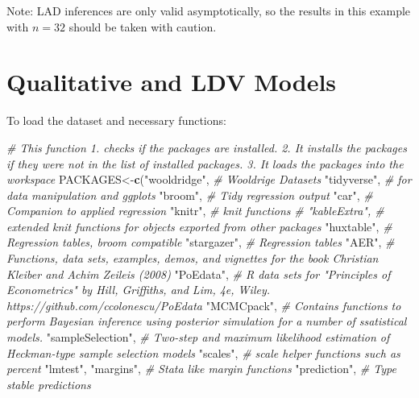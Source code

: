\documentclass[]{book}
\newenvironment{Shaded}{\begin{snugshade}}{\end{snugshade}}
\newcommand{\CommentTok}[1]{\textcolor[rgb]{0.56,0.35,0.01}{\textit{#1}}}
\newcommand{\KeywordTok}[1]{\textcolor[rgb]{0.13,0.29,0.53}{\textbf{#1}}}
\newcommand{\NormalTok}[1]{#1}
\newcommand{\StringTok}[1]{\textcolor[rgb]{0.31,0.60,0.02}{#1}}
\begin{document}
Note: LAD inferences are only valid asymptotically, so the results in
this example with \(n =32\) should be taken with caution.

\hypertarget{binarymodels}{%
\chapter{Qualitative and LDV Models}\label{binarymodels}}

To load the dataset and necessary functions:

\begin{Shaded}
\begin{Highlighting}[]
\CommentTok{# This function 1. checks if the packages are installed. 2. It installs the packages if they were not in the list of installed packages. 3. It loads the packages into the workspace}
\NormalTok{PACKAGES<-}\KeywordTok{c}\NormalTok{(}\StringTok{"wooldridge"}\NormalTok{,  }\CommentTok{# Wooldrige Datasets}
            \StringTok{"tidyverse"}\NormalTok{,  }\CommentTok{# for data manipulation and ggplots}
            \StringTok{"broom"}\NormalTok{,  }\CommentTok{# Tidy regression output}
            \StringTok{"car"}\NormalTok{, }\CommentTok{# Companion to applied regression}
            \StringTok{"knitr"}\NormalTok{, }\CommentTok{# knit functions}
            \CommentTok{# "kableExtra", # extended knit functions for objects exported from other packages}
            \StringTok{"huxtable"}\NormalTok{, }\CommentTok{#  Regression tables, broom compatible}
            \StringTok{"stargazer"}\NormalTok{, }\CommentTok{# Regression tables}
            \StringTok{"AER"}\NormalTok{, }\CommentTok{#  Functions, data sets, examples, demos, and vignettes for the book Christian Kleiber and Achim Zeileis (2008)}
            \StringTok{"PoEdata"}\NormalTok{, }\CommentTok{# R data sets for "Principles of Econometrics" by Hill, Griffiths, and Lim, 4e, Wiley. https://github.com/ccolonescu/PoEdata}
            \StringTok{"MCMCpack"}\NormalTok{, }\CommentTok{# Contains functions to perform Bayesian inference using posterior simulation for a number of ssatistical models.}
            \StringTok{"sampleSelection"}\NormalTok{, }\CommentTok{# Two-step and maximum likelihood estimation of Heckman-type sample selection models}
            \StringTok{"scales"}\NormalTok{, }\CommentTok{# scale helper functions such as percent }
            \StringTok{"lmtest"}\NormalTok{, }
            \StringTok{"margins"}\NormalTok{, }\CommentTok{# Stata like margin functions}
            \StringTok{"prediction"}\NormalTok{, }\CommentTok{# Type stable predictions}

\end{Highlighting}
\end{Shaded}
\end{document}

